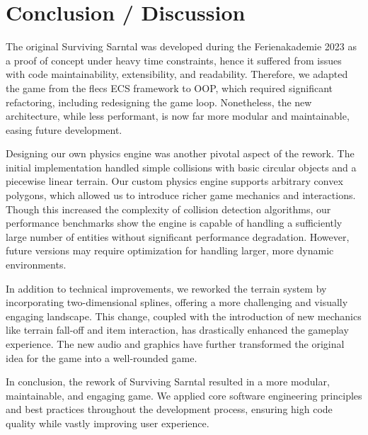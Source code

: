 \section{Conclusion / Discussion}

The original Surviving Sarntal was developed during the Ferienakademie 2023 as a proof of concept under heavy time constraints, hence it suffered from issues with code maintainability, extensibility, and readability.
Therefore, we adapted the game from the flecs ECS framework \cite{flecs_library} to OOP, which required significant refactoring, including redesigning the game loop.
Nonetheless, the new architecture, while less performant, is now far more modular and maintainable, easing future development.

Designing our own physics engine was another pivotal aspect of the rework. 
The initial implementation handled simple collisions with basic circular objects and a piecewise linear terrain.
Our custom physics engine supports arbitrary convex polygons, which allowed us to introduce richer game mechanics and interactions. 
Though this increased the complexity of collision detection algorithms, our performance benchmarks show the engine is capable of handling a sufficiently large number of entities without significant performance degradation. 
However, future versions may require optimization for handling larger, more dynamic environments.

In addition to technical improvements, we reworked the terrain system by incorporating two-dimensional splines, offering a more challenging and visually engaging landscape. 
This change, coupled with the introduction of new mechanics like terrain fall-off and item interaction, has drastically enhanced the gameplay experience. 
The new audio and graphics have further transformed the original idea for the game into a well-rounded game. 

In conclusion, the rework of Surviving Sarntal resulted in a more modular, maintainable, and engaging game. 
We applied core software engineering principles and best practices throughout the development process, ensuring high code quality while vastly improving user experience. 
